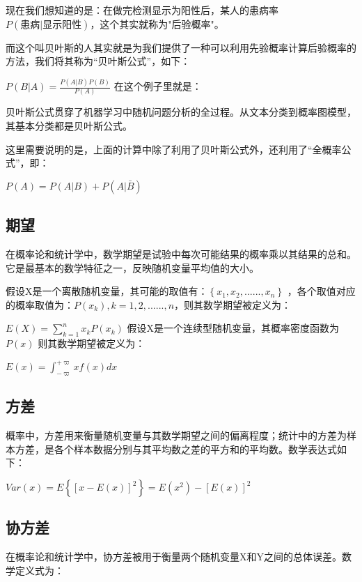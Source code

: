\documentclass[11pt]{book}
\newcounter{#2}
\newcounter{#2}[#1]
\numberwithin{#2}{#1}
\begin{document}
现在我们想知道的是：在做完检测显示为阳性后，某人的患病率$ P(患病|显示阳性) $，这个其实就称为"后验概率"。

而这个叫贝叶斯的人其实就是为我们提供了一种可以利用先验概率计算后验概率的方法，我们将其称为“贝叶斯公式”，如下：

$ P\left( B|A \right) =\frac{P\left( A|B \right)P\left( B\right)  }{P\left( A \right) }  $
在这个例子里就是：

贝叶斯公式贯穿了机器学习中随机问题分析的全过程。从文本分类到概率图模型，其基本分类都是贝叶斯公式。

这里需要说明的是，上面的计算中除了利用了贝叶斯公式外，还利用了“全概率公式”，即：

$ P\left( A \right) =P\left( A|B \right)+P\left( A|\bar{B}  \right)   $

\subsection{期望}

在概率论和统计学中，数学期望是试验中每次可能结果的概率乘以其结果的总和。它是最基本的数学特征之一，反映随机变量平均值的大小。

假设$  $X是一个离散随机变量，其可能的取值有：$ \left\{ x_{1} ,x_{2} ,......,x_{n}  \right\} $ ，各个取值对应的概率取值为：$ P\left( x_{k} \right)  , k=1,2,......,n $，则其数学期望被定义为：

$ E\left(X \right) =\sum_{k=1}^{n}{x_{k} P\left( x_{k}  \right) }  $
假设X是一个连续型随机变量，其概率密度函数为$ P\left( x \right) $ 则其数学期望被定义为：

$ E\left( x \right) =\int_{-\varpi }^{+\varpi } xf\left( x \right) dx $

\subsection{方差 }

概率中，方差用来衡量随机变量与其数学期望之间的偏离程度；统计中的方差为样本方差，是各个样本数据分别与其平均数之差的平方和的平均数。数学表达式如下： 

$ Var\left( x \right) =E\left\{ \left[ x-E\left( x \right)  \right] ^{2}   \right\} =E\left( x^{2}  \right) -\left[ E\left( x \right)  \right] ^{2}  $

\subsection{协方差}

在概率论和统计学中，协方差被用于衡量两个随机变量X和Y之间的总体误差。数学定义式为：
\end{document}
